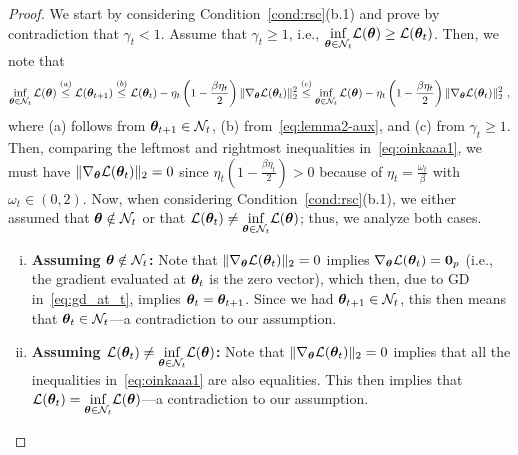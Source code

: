 \begin{proof}
We start by considering Condition~\ref{cond:rsc}(b.1) and 
prove by contradiction that $\gamma_t<1$. Assume that $\gamma_t\geq 1$, i.e., 
$\underset{{\bm{\theta}} \in \mathcal{N}_t}{\inf}{\mathcal{L}}({\bm{\theta}})\geq {\cal L}({\bm{\theta}}_{t})$. Then, we note that 
\begin{align}
\label{eq:oinkaaa1}
\inf_{{\bm{\theta}} \in \mathcal{N}_t} {\mathcal{L}}({\bm{\theta}}) \overset{(a)}{\leq} {\mathcal{L}}({\bm{\theta}}_{t+1}) \overset{(b)}{\leq} {\mathcal{L}}({\bm{\theta}}_t) - \eta_t \left( 1 - \frac{\beta \eta_t}{2} \right) \| \nabla_{\bm{\theta}}{\mathcal{L}}({\bm{\theta}}_t) \|_2^2 \overset{(c)}{\leq} \inf_{{\bm{\theta}} \in \mathcal{N}_t} {\mathcal{L}}({\bm{\theta}})- \eta_t \left( 1 - \frac{\beta \eta_t}{2} \right) \| \nabla_{\bm{\theta}}{\mathcal{L}}({\bm{\theta}}_t) \|_2^2~, 
\end{align}
where (a) follows from ${\bm{\theta}}_{t+1}\in\mathcal{N}_t$, (b) from~\eqref{eq:lemma2-aux}, and (c) from $\gamma_t\geq 1$. Then, comparing the leftmost and rightmost inequalities in~\eqref{eq:oinkaaa1}, we must have $\| \nabla_{\bm{\theta}}{\mathcal{L}}({\bm{\theta}}_t) \|_2 = 0$ since $\eta_t \left( 1 - \frac{\beta \eta_t}{2} \right)>0$ because of $\eta_t = \frac{\omega_t}{\beta}$ with $\omega_t \in (0,2)$. 
%
%
Now, when considering Condition~\ref{cond:rsc}(b.1), we either assumed that ${\bm{\theta}}\notin\mathcal{N}_t$ or that ${\mathcal{L}}({\bm{\theta}}_t)\neq\underset{{\bm{\theta}} \in \mathcal{N}_t}{\inf} {\mathcal{L}}({\bm{\theta}})$; thus, we analyze both cases.
\begin{enumerate}[(i)]
    \item \label{condi}\textbf{Assuming ${\bm{\theta}}\notin\mathcal{N}_t$:} Note that $\| \nabla_{\bm{\theta}}{\mathcal{L}}({\bm{\theta}}_t) \|_2 = 0$ implies $ \nabla_{\bm{\theta}}{\mathcal{L}}({\bm{\theta}}_t) = {\bm{0}}_p$ (i.e., the gradient evaluated at ${\bm{\theta}}_t$ is the zero vector), which then, due to GD in~\eqref{eq:gd_at_t}, implies ${\bm{\theta}}_t={\bm{\theta}}_{t+1}$. Since we had ${\bm{\theta}}_{t+1}\in\mathcal{N}_t$, this then means that ${\bm{\theta}}_t\in\mathcal{N}_t$---a contradiction to our assumption.
    \item \label{condii}\textbf{Assuming ${\mathcal{L}}({\bm{\theta}}_t)\neq\underset{{\bm{\theta}} \in \mathcal{N}_t}{\inf}{\mathcal{L}}({\bm{\theta}})$:} Note that $\| \nabla_{\bm{\theta}}{\mathcal{L}}({\bm{\theta}}_t) \|_2 = 0$ implies that all the inequalities in~\eqref{eq:oinkaaa1} are also equalities. This then implies that ${\mathcal{L}}({\bm{\theta}}_t)=\underset{{\bm{\theta}} \in \mathcal{N}_t}{\inf}{\mathcal{L}}({\bm{\theta}})$---a contradiction to our assumption.

\end{enumerate}
\end{proof}
